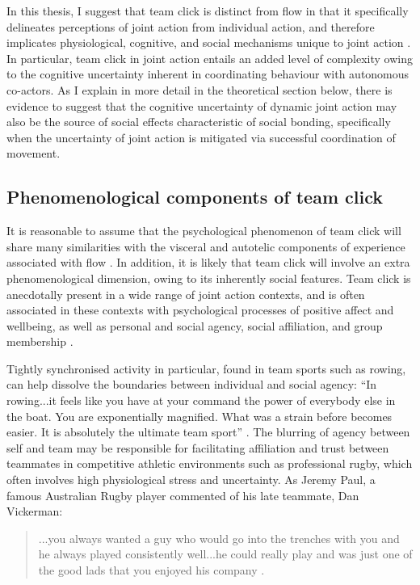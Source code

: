 \begin{CJK}{UTF8}{gbsn}
In this thesis, I suggest that team click is distinct from flow in that it specifically delineates perceptions of joint action from individual action, and therefore implicates physiological, cognitive, and social mechanisms unique to joint action \citep{Vesper2010}.  In particular, team click in joint action entails an added level of complexity owing to the cognitive uncertainty inherent in coordinating behaviour with autonomous co-actors.  As I explain in more detail in the theoretical section below, there is evidence to suggest that the cognitive uncertainty of dynamic joint action may also be the source of social effects characteristic of social bonding, specifically when the uncertainty of joint action is mitigated via successful coordination of movement.


\subsection{Phenomenological components of team click}
It is reasonable to assume that the psychological phenomenon of team click will share many similarities with the visceral and autotelic components of experience associated with flow \citep{Sawyer2006}.  In addition, it is likely that team click will involve an extra phenomenological dimension, owing to its inherently social features.  Team click is anecdotally present in a wide range of joint action contexts, and is often associated in these contexts with psychological processes of positive affect and wellbeing, as well as personal and social agency, social affiliation, and group membership \citep{Jackson1995,Marsh2009,Wheatley2012,Slingerland2014}.

Tightly synchronised activity in particular, found in team sports such as rowing, can help dissolve the boundaries between individual and social agency: ``In rowing...it feels like you have at your command the power of everybody else in the boat. You are exponentially magnified. What was a strain before becomes easier. It is absolutely the ultimate team sport'' \citep[x]{Brown2016}.
The blurring of agency between self and team may be responsible for facilitating affiliation and trust between teammates in competitive athletic environments such as professional rugby, which often involves high physiological stress and uncertainty.  As Jeremy Paul, a famous Australian Rugby player commented of his late teammate, Dan Vickerman:

      \begin{quote}
        ...you always wanted a guy who would go into the trenches with you and he always played consistently well...he could really play and was just one of the good lads that you enjoyed his company \citep{Fox-Sports2017}.
      \end{quote}


\end{CJK}
